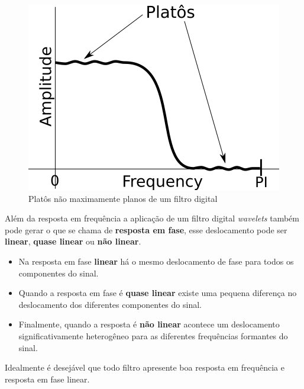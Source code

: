 \begin{myenv}{1.5}
				\begin{figure}[h]
					\centering
					\includegraphics[width=0.3\linewidth]{images/noMaximallyFlat}
					\caption{Platôs não maximamente planos de um filtro digital}
					\label{fig:nomaximallyflat}
				\end{figure}
			
				\par Além da resposta em frequência a aplicação de um filtro digital \textit{wavelets} também pode gerar o que se chama de \textbf{resposta em fase}, esse deslocamento pode ser \textbf{linear}, \textbf{quase linear} ou \textbf{não linear}. 
				
				\begin{itemize}
					\item Na resposta em fase \textbf{linear} há o mesmo deslocamento de fase para todos os componentes do sinal.
					\item Quando a resposta em fase é \textbf{quase linear} existe uma pequena diferença no deslocamento dos diferentes componentes do sinal.
					\item Finalmente, quando a resposta é \textbf{não linear} acontece um deslocamento significativamente heterogêneo para as diferentes frequências formantes do sinal.
					\end{itemize}
				
				\par Idealmente é desejável que todo filtro apresente boa resposta em frequência e resposta em fase linear.
				
			
			

\end{myenv}
